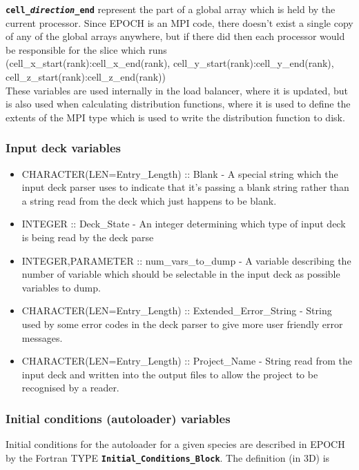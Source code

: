 \documentclass[12pt]{article}
\newcommand{\inlinecode}[1]{{\color{warwickred} \bf\texttt{#1}}}
\newcommand{\EPOCH}{{\color{warwickdark}\fontfamily{phv}\selectfont EPOCH} }
\begin{document}
\inlinecode{cell\_{\it direction}\_end} represent the part of a global array
which is held by the current processor. Since \EPOCH is an MPI code, there
doesn't exist a single copy of any of the global arrays anywhere, but if there
did then each processor would be responsible for the slice which runs\\
(cell\_x\_start(rank):cell\_x\_end(rank),
cell\_y\_start(rank):cell\_y\_end(rank),
cell\_z\_start(rank):cell\_z\_end(rank))\\
These variables are used internally in the load balancer, where it is updated,
but is also used when calculating distribution functions, where it is used to
define the extents of the MPI type which is used to write the distribution
function to disk.
\pagebreak

\subsubsection{Input deck variables}
\begin{itemize}
\item CHARACTER(LEN=Entry\_Length) :: Blank - A special string which the input
  deck parser uses to indicate that it's passing a blank string rather than a
  string read from the deck which just happens to be blank.
\item INTEGER :: Deck\_State - An integer determining which type of input deck
  is being read by the deck parse
\item INTEGER,PARAMETER :: num\_vars\_to\_dump - A variable describing the
  number of variable which should be selectable in the input deck as possible
  variables to dump.
\item CHARACTER(LEN=Entry\_Length) :: Extended\_Error\_String - String used by
  some error codes in the deck parser to give more user friendly error
  messages.
\item CHARACTER(LEN=Entry\_Length) :: Project\_Name - String read from the
  input deck and written into the output files to allow the project to be
  recognised by a reader.
\end{itemize}
\pagebreak

\subsubsection{Initial conditions (autoloader) variables}
Initial conditions for the autoloader for a given species are described in
\EPOCH by the Fortran TYPE \inlinecode{Initial\_Conditions\_Block}. The
definition (in 3D) is
\end{document}
